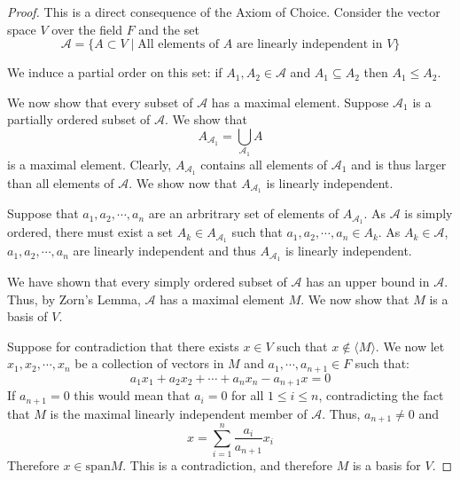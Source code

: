 \documentclass[a4paper]{report}
\begin{document}
\begin{proof}
  This is a direct consequence of the Axiom of Choice.
  Consider the vector space $V$ over the field $F$ and the set
  \[
    \mathcal{A} = \{A \subset V \mid \text{All elements of } A \text{ are linearly independent in } V \}    
  \]

  We induce a partial order on this set: if $A_1, A_2 \in \mathcal{A}$ and $A_1 \subseteq A_2$ then $A_1 \leq A_2$.

  We now show that every subset of $\mathcal{A}$ has a maximal element. Suppose $\mathcal{A}_1$ is a partially ordered subset of $\mathcal{A}$. We show that
\begin{equation*}
  A_{\mathcal{A}_1} = \bigcup_{\mathcal{A}_1}A
\end{equation*}
is a maximal element. Clearly, $A_{\mathcal{A}_1}$ contains all elements of $\mathcal{A}_1$ and is thus larger than all elements of $\mathcal{A}$. We show now that $A_{\mathcal{A}_1}$ is linearly independent.

Suppose that $a_1, a_2, \cdots, a_n$ are an arbritrary set of elements of $A_{\mathcal{A}_1}$. As $\mathcal{A}$ is simply ordered, there must exist a set $A_{k} \in A_{\mathcal{A}_1}$ such that $a_1, a_2, \cdots, a_n \in A_{k}$. As $A_k \in \mathcal{A}$, $a_1, a_2, \cdots, a_n$ are linearly independent and thus $A_{\mathcal{A}_1}$ is linearly independent.
        
        We have shown that every simply ordered subset of $\mathcal{A}$ has an upper bound in $\mathcal{A}$. Thus, by Zorn's Lemma, $\mathcal{A}$ has a maximal element $M$. We now show that $M$ is a basis of $V$.

  Suppose for contradiction that there exists $x \in V$ such that $x \notin \langle M \rangle$. We now let $x_1, x_2, \cdots, x_n$ be a collection of vectors in $M$ and $a_1, \cdots,a_{n + 1} \in F$ such that:
  \[
    a_1x_1 + a_2x_2 + \cdots + a_nx_n - a_{n + 1}x = 0
  \]
  If $a_{n + 1}=0$ this would mean that $a_i = 0$ for all $1 \leq i \leq n$, contradicting the fact that $M$ is the maximal linearly independent member of $\mathcal{A}$. Thus,  $a_{n + 1}\neq 0$ and
  \[
    x = \sum_{i = 1}^n{\frac{a_i}{a_{n + 1}}x_i}    
  \]
  Therefore $x \in \mathrm{span}{M}$. This is a contradiction, and therefore $M$ is a basis for $V$.

\end{proof}



\end{document}
